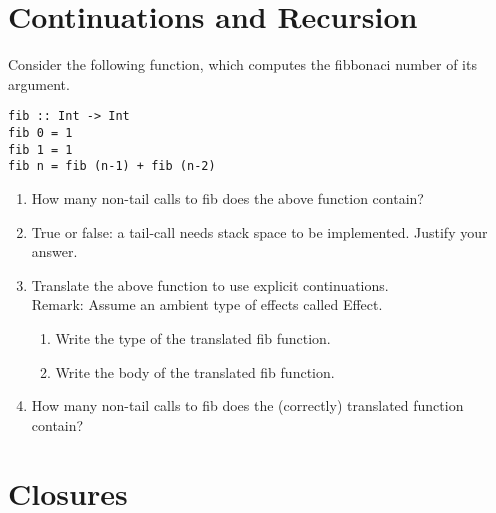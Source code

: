 \documentclass{article}
\newcommand{\answer}[1]{}
\begin{document}
\section{Continuations and Recursion}

Consider the following function, which computes the fibbonaci number
of its argument.
\begin{verbatim}
fib :: Int -> Int
fib 0 = 1
fib 1 = 1
fib n = fib (n-1) + fib (n-2)
\end{verbatim}

\begin{enumerate}
\item How many non-tail calls to fib does the above function contain?
\item True or false: a tail-call needs stack space to be
  implemented. Justify your answer. 
\item Translate the above function to use explicit continuations.
  \\ Remark: Assume an ambient type of effects called Effect.
  \begin{enumerate}
  \item  Write the type of the translated fib function. 
  \item  Write the body of the translated fib function. 
  \end{enumerate}
\item How many non-tail calls to fib does the (correctly) translated function
  contain? 
\end{enumerate}

\answer{
  \begin{enumerate}
  \item 2
  \item False. None of the data saved on the stack will be used after a tail call returns.
  \item 
\begin{verbatim}
fib :: Int -> (Int -> eff) -> eff
fib 0 k = k 1
fib 1 k = k 1
fib n k = fib (n-1) $ \x ->
          fib (n-2) $ \y ->
          k (x+y)
\end{verbatim}
\item 0
  \end{enumerate}
}

\newpage
\section{Closures}
\end{document}

